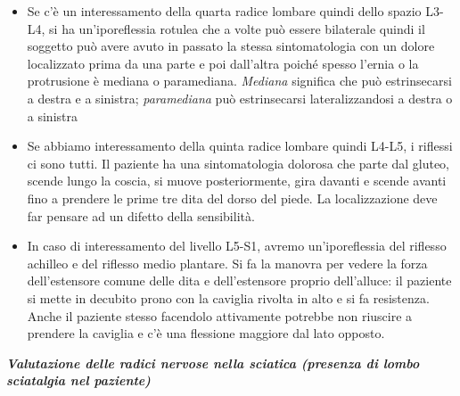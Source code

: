 \begin{itemize}
\item
  Se c'è un interessamento della quarta radice lombare quindi dello
  spazio L3-L4, si ha un'iporeflessia rotulea che a volte può essere
  bilaterale quindi il soggetto può avere avuto in passato la stessa
  sintomatologia con un dolore localizzato prima da una parte e poi
  dall'altra poiché spesso l'ernia o la protrusione è mediana o
  paramediana. \emph{Mediana} significa che può estrinsecarsi a destra e
  a sinistra; \emph{paramediana} può estrinsecarsi lateralizzandosi a
  destra o a sinistra
\item
  Se abbiamo interessamento della quinta radice lombare quindi L4-L5, i
  riflessi ci sono tutti. Il paziente ha una sintomatologia dolorosa che
  parte dal gluteo, scende lungo la coscia, si muove posteriormente,
  gira davanti e scende avanti fino a prendere le prime tre dita del
  dorso del piede. La localizzazione deve far pensare ad un difetto
  della sensibilità.
\item
  In caso di interessamento del livello L5-S1, avremo un'iporeflessia
  del riflesso achilleo e del riflesso medio plantare. Si fa la manovra
  per vedere la forza dell'estensore comune delle dita e dell'estensore
  proprio dell'alluce: il paziente si mette in decubito prono con la
  caviglia rivolta in alto e si fa resistenza. Anche il paziente stesso
  facendolo attivamente potrebbe non riuscire a prendere la caviglia e
  c'è una flessione maggiore dal lato opposto.
\end{itemize}

 
\emph{\textbf{\emph{Valutazione delle radici nervose nella sciatica
(presenza di lombo sciatalgia nel paziente)}}}
 
